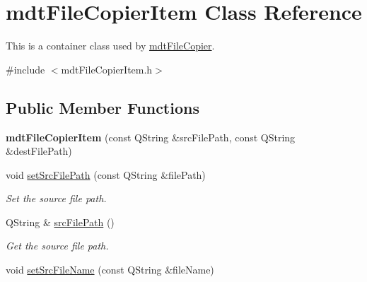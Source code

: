 \hypertarget{classmdt_file_copier_item}{
\section{mdtFileCopierItem Class Reference}
\label{classmdt_file_copier_item}
}


This is a container class used by \hyperlink{classmdt_file_copier}{mdtFileCopier}.  




{\ttfamily \#include $<$mdtFileCopierItem.h$>$}

\subsection*{Public Member Functions}
\begin{DoxyCompactItemize}
\item 
\hypertarget{classmdt_file_copier_item_a5c693ba1085b9aba9dbad740aa896c5e}{
{\bfseries mdtFileCopierItem} (const QString \&srcFilePath, const QString \&destFilePath)}
\label{classmdt_file_copier_item_a5c693ba1085b9aba9dbad740aa896c5e}

\item 
\hypertarget{classmdt_file_copier_item_ac0f38067d504644f35040054951f0ae0}{
void \hyperlink{classmdt_file_copier_item_ac0f38067d504644f35040054951f0ae0}{setSrcFilePath} (const QString \&filePath)}
\label{classmdt_file_copier_item_ac0f38067d504644f35040054951f0ae0}

\begin{DoxyCompactList}\small\item\em Set the source file path. \end{DoxyCompactList}\item 
\hypertarget{classmdt_file_copier_item_ace10385b5d1b591935ace03139c5a3db}{
QString \& \hyperlink{classmdt_file_copier_item_ace10385b5d1b591935ace03139c5a3db}{srcFilePath} ()}
\label{classmdt_file_copier_item_ace10385b5d1b591935ace03139c5a3db}

\begin{DoxyCompactList}\small\item\em Get the source file path. \end{DoxyCompactList}\item 
\hypertarget{classmdt_file_copier_item_aaa40ea880f28da1f8eb08f86fdc778b6}{
void \hyperlink{classmdt_file_copier_item_aaa40ea880f28da1f8eb08f86fdc778b6}{setSrcFileName} (const QString \&fileName)}
\label{classmdt_file_copier_item_aaa40ea880f28da1f8eb08f86fdc778b6}


\end{DoxyCompactItemize}
